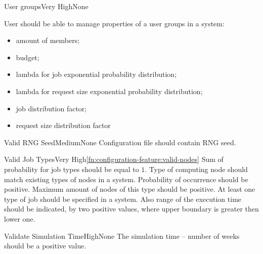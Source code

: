 	\begin{functional}{User groups}{Very High}{None}
		\label{fn:configuration-feature:user-groups}
		{
			User should be able to manage properties of a user groups in a system:
			\begin{itemize}
				\item amount of members;
				\item budget;
				\item lambda for job exponential probability distribution;
				\item lambda for request size exponential probability distribution;
				\item job distribution factor;
				\item request size distribution factor
			\end{itemize} 
		}
	\end{functional}

		
	\begin{functional}{Valid \gls{RNG} Seed}{Medium}{None}
		\label{fn:configuration-feature:valid-rng-seed}
		{
			Configuration file should contain \gls{RNG} seed.
		}
	\end{functional}
	
	\begin{functional}{Valid Job Types}{Very High}{\ref{fn:configuration-feature:valid-nodes}}
		\label{fn:configuration-feature:valid-job-types}
		{
			Sum of probability for job types should be equal to $1$. Type of \gls{computing node} should match existing types of nodes in a system. Probability of occurrence should be positive. Maximum amount of nodes of this type should be positive. At least one type of job should be specified in a system. Also range of the execution time should be indicated, by two positive values, where upper boundary is greater then lower one.
		}
	\end{functional}

	\begin{functional}{Validate Simulation Time}{High}{None}
		\label{fn:configuration-feature:validate-simulation-time}
		{
			The simulation time -- number of weeks should be a positive value.
		}
	\end{functional}

